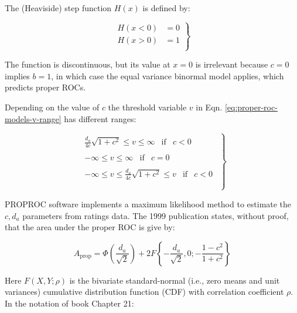 \documentclass[
]{book}
\begin{document}
The (Heaviside) step function \(H(x)\) is defined by:

\begin{equation} 
\left.\begin{aligned}
H\left( x < 0 \right) &= 0 \\
H\left( x > 0 \right) &= 1 \\
\end{aligned}\right\}
\label{eq:proper-roc-models-heaviside}
\end{equation}

The function is discontinuous, but its value at \(x = 0\) is irrelevant because \(c = 0\) implies \(b = 1\), in which case the equal variance binormal model applies, which predicts proper ROCs.

Depending on the value of \(c\) the threshold variable \(v\) in Eqn. \eqref{eq:proper-roc-models-v-range} has different ranges:

\begin{equation} 
\left.\begin{aligned}
\begin{matrix}
\frac{d_a}{4c}\sqrt{1+c^2} \le v \le \infty & \text{if} & c<0 
\end{matrix}\\
\begin{matrix}
-\infty \le v \le \infty & \text{if} & c=0 
\end{matrix}\\
\begin{matrix}
-\infty \le v \le\frac{d_a}{4c}\sqrt{1+c^2} \le v & \text{if} & c<0 
\end{matrix}\\
\\
\end{aligned}\right\}
\label{eq:proper-roc-models-limits-v}
\end{equation}

PROPROC software implements a maximum likelihood method to estimate the \(c, d_a\) parameters from ratings data. The 1999 publication \citep{metz1999proper} states, without proof, that the area under the proper ROC is give by:

\begin{equation} 
A_{\text{prop}}=\Phi\left( \frac{d_a}{\sqrt{2}} \right) + 2F\left\{-\frac{d_a}{\sqrt{2}},0;-\frac{1-c^2}{1+c^2}  \right\}
\label{eq:proper-roc-models-metz-36}
\end{equation}

Here \(F(X,Y;\rho)\) is the bivariate standard-normal (i.e., zero means and unit variances) cumulative distribution function (CDF) with correlation coefficient \(\rho\). In the notation of book Chapter 21:
\end{document}
